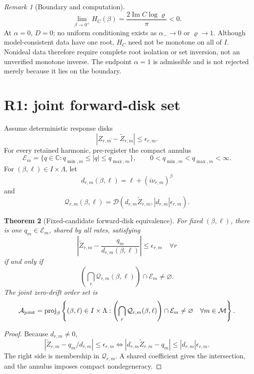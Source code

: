 \documentclass[11pt]{article}
\newtheorem{theorem}{Theorem}
\theoremstyle{definition}
\theoremstyle{remark}
\newtheorem{remark}[theorem]{Remark}
\newcommand{\C}{\mathbb C}
\newcommand{\Aset}{\mathcal A}
\newcommand{\Eset}{\mathcal E}
\newcommand{\Mset}{\mathcal M}
\newcommand{\proj}{\operatorname{proj}}
\begin{document}
\begin{remark}[Boundary and computation]
\[
 \lim_{\beta\to0^+}H_C(\beta)
 =\frac{2\operatorname{Im}C\log\varrho}{\pi}<0.
\]
At \(\alpha=0\), \(D=0\); no uniform conditioning exists as
\(\alpha_-\to0\) or \(\varrho\to1\).  Although model-consistent data have one
root, \(H_C\) need not be monotone on all of \(I\).  Nonideal data therefore
require complete root isolation or set inversion, not an unverified monotone
inverse.  The endpoint \(\alpha=1\) is admissible and is not rejected merely
because it lies on the boundary.
\end{remark}

\section{R1: joint forward-disk set}

Assume deterministic response disks
\begin{equation}
 |Z_{r,m}-\widetilde Z_{r,m}|\le\epsilon_{r,m}.
 \label{eq:response-disks}
\end{equation}
For every retained harmonic, pre-register the compact annulus
\[
 \Eset_m=\{q\in\C:q_{\min,m}\le|q|\le q_{\max,m}\},
 \qquad 0<q_{\min,m}<q_{\max,m}<\infty.
\]
For \((\beta,\ell)\in I\times\Lambda\), let
\[
 d_{r,m}(\beta,\ell)=\ell+(i\nu_{r,m})^\beta
\]
and
\begin{equation}
 \mathcal Q_{r,m}(\beta,\ell)=
 \mathcal D(d_{r,m}\widetilde Z_{r,m},
            |d_{r,m}|\epsilon_{r,m}).
 \label{eq:q-disk}
\end{equation}

\begin{theorem}[Fixed-candidate forward-disk equivalence]
\label{thm:forward}
For fixed \((\beta,\ell)\), there is one \(q_m\in\Eset_m\), shared by all
rates, satisfying
\[
 \left|\widetilde Z_{r,m}-\frac{q_m}{d_{r,m}(\beta,\ell)}\right|
 \le\epsilon_{r,m}\quad\forall r
\]
if and only if
\begin{equation}
 \left(\bigcap_r\mathcal Q_{r,m}(\beta,\ell)\right)
 \cap\Eset_m\ne\varnothing.
 \label{eq:intersection}
\end{equation}
The joint zero-drift order set is
\begin{equation}
 \Aset_{\rm joint}=\proj_\beta
 \left\{(\beta,\ell)\in I\times\Lambda:
 \left(\bigcap_r\mathcal Q_{r,m}(\beta,\ell)\right)
 \cap\Eset_m\ne\varnothing\quad\forall m\in\Mset\right\}.
 \label{eq:joint}
\end{equation}
\end{theorem}
\begin{proof}
Because \(d_{r,m}\ne0\),
\[
 \left|\widetilde Z_{r,m}-q_m/d_{r,m}\right|\le\epsilon_{r,m}
 \iff |d_{r,m}\widetilde Z_{r,m}-q_m|
 \le|d_{r,m}|\epsilon_{r,m}.
\]
The right side is membership in \(\mathcal Q_{r,m}\).  A shared coefficient
gives the intersection, and the annulus imposes compact nondegeneracy.
\end{proof}
\end{document}
